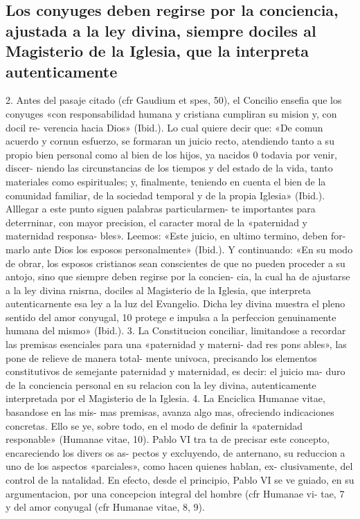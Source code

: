 \documentclass[letterpaper]{report}
\begin{document}
		\subsection{Los conyuges deben regirse por la conciencia, ajustada a la ley divina,
		 siempre dociles al Magisterio de la Iglesia, que la interpreta autenticamente}
		 	2. Antes del pasaje citado (cfr Gaudium et spes, 50), 
			el Concilio ensefia que los conyuges «con responsabilidad 
			humana y cristiana cumpliran su mision y, con docil re- 
			verencia hacia Dios» (Ibid.). Lo cual quiere decir que: «De 
			comun acuerdo y cornun esfuerzo, se formaran un juicio 
			recto, atendiendo tanto a su propio bien personal como al 
			bien de los hijos, ya nacidos 0 todavia por venir, discer- 
			niendo las circunstancias de los tiempos y del estado de 
			la vida, tanto materiales como espirituales; y, finalmente, 
			teniendo en cuenta el bien de la comunidad familiar, de 
			la sociedad temporal y de la propia Iglesia» (Ibid.). 
			Alllegar a este punto siguen palabras particularmen- 
			te importantes para deterrninar, con mayor precision, el 
			caracter moral de la «paternidad y maternidad responsa- 
			bles». Leemos: «Este juicio, en ultimo termino, deben for- 
			marlo ante Dios los esposos personalmente» (Ibid.). 
			Y continuando: «En su modo de obrar, los esposos 
			cristianos sean conscientes de que no pueden proceder a 
			su antojo, sino que siempre deben regirse por la concien- 
			cia, la cual ha de ajustarse a la ley divina rnisrna, dociles 
			al Magisterio de la Iglesia, que interpreta autenticarnente 
			esa ley a la luz del Evangelio. Dicha ley divina muestra el 
			pleno sentido del amor conyugal, 10 protege e impulsa a 
			la perfeccion genuinamente humana del mismo» (Ibid.). 
			3. La Constitucion conciliar, limitandose a recordar 
			las premisas esenciales para una «paternidad y materni- 
			dad res pons ables», las pone de relieve de manera total- 
			mente univoca, precisando los elementos constitutivos de 
			semejante paternidad y maternidad, es decir: el juicio ma- 
			duro de la conciencia personal en su relacion con la ley 
			divina, autenticamente interpretada por el Magisterio de 
			la Iglesia. 
			4. La Enciclica Humanae vitae, basandose en las mis- 
			mas premisas, avanza algo mas, ofreciendo indicaciones 
			concretas. Ello se ye, sobre todo, en el modo de definir la 
			«paternidad responable» (Humanae vitae, 10). Pablo VI tra 
			ta de precisar este concepto, encareciendo los divers os as- 
			pectos y excluyendo, de anternano, su reduccion a uno de 
			los aspectos «parciales», como hacen quienes hablan, ex- 
			clusivamente, del control de la natalidad. En efecto, desde 
			el principio, Pablo VI se ve guiado, en su argumentacion, 
			por una concepcion integral del hombre (cfr Humanae vi- 
			tae, 7~ y del amor conyugal (cfr Humanae vitae, 8, 9).
			
\end{document}
